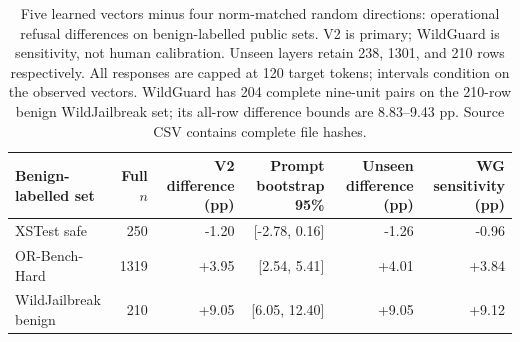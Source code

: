 \begin{table}[t]
\centering\small
\begin{tabular}{lrrrrr}
\toprule
Benign-labelled set & Full $n$ & V2 difference (pp) & Prompt bootstrap 95\% & Unseen difference (pp) & WG sensitivity (pp) \\
\midrule
XSTest safe & 250 & -1.20 & [-2.78, 0.16] & -1.26 & -0.96 \\
OR-Bench-Hard & 1319 & +3.95 & [2.54, 5.41] & +4.01 & +3.84 \\
WildJailbreak benign & 210 & +9.05 & [6.05, 12.40] & +9.05 & +9.12 \\
\bottomrule
\end{tabular}
\caption{Five learned vectors minus four norm-matched random directions: operational refusal differences on benign-labelled public sets. V2 is primary; WildGuard is sensitivity, not human calibration. Unseen layers retain 238, 1301, and 210 rows respectively. All responses are capped at 120 target tokens; intervals condition on the observed vectors. WildGuard has 204 complete nine-unit pairs on the 210-row benign WildJailbreak set; its all-row difference bounds are 8.83--9.43 pp. Source CSV contains complete file hashes.}
\label{tab:public-refusal-nine}
\end{table}
